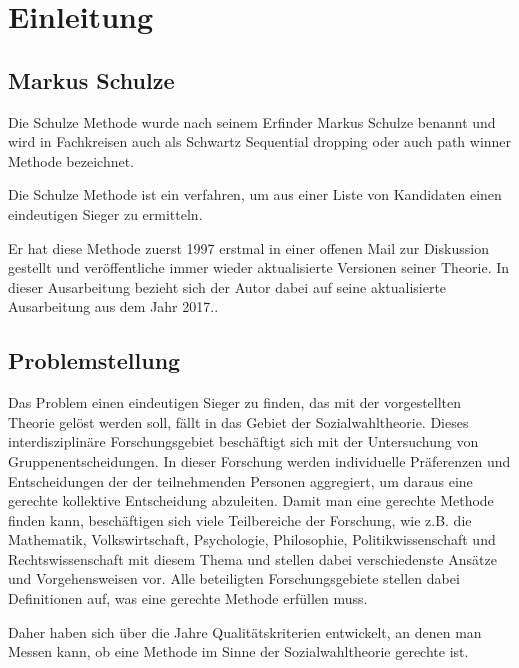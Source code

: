 \section{Einleitung}
\label{sec:Einleitung}


\subsection{Markus Schulze} 
\label{sec:markusSchulze}
Die Schulze Methode wurde nach seinem Erfinder Markus Schulze benannt und wird in Fachkreisen auch als \glqq Schwartz Sequential dropping\grqq{} oder auch \glqq path winner\grqq{} Methode bezeichnet.

Die Schulze Methode ist ein verfahren, um aus einer Liste von Kandidaten einen eindeutigen Sieger zu ermitteln.

Er hat diese Methode zuerst 1997 erstmal in einer offenen Mail zur Diskussion gestellt und veröffentliche immer wieder aktualisierte Versionen seiner Theorie. In dieser Ausarbeitung bezieht sich der Autor dabei auf seine aktualisierte Ausarbeitung aus dem Jahr 2017.\citet[vgl.]{Schulze2017}.

\subsection{Problemstellung} 
\label{sec:problemstellung}
Das Problem einen eindeutigen Sieger zu finden, das mit der vorgestellten Theorie gelöst werden soll, fällt in das Gebiet der Sozialwahltheorie. Dieses interdisziplinäre Forschungsgebiet beschäftigt sich mit der Untersuchung von Gruppenentscheidungen. In dieser Forschung werden individuelle Präferenzen und Entscheidungen der der teilnehmenden Personen aggregiert, um daraus eine \glqq gerechte\grqq{} kollektive Entscheidung abzuleiten. Damit man eine \glqq gerechte\grqq{} Methode finden kann, beschäftigen sich viele Teilbereiche der Forschung, wie z.B. die Mathematik, Volkswirtschaft, Psychologie, Philosophie, Politikwissenschaft und Rechtswissenschaft mit diesem Thema und stellen dabei verschiedenste Ansätze und Vorgehensweisen vor. Alle beteiligten Forschungsgebiete stellen dabei Definitionen auf, was eine \glqq gerechte\grqq{} Methode erfüllen muss. \cite[vgl.]{scheubrein2013computerunterstuetzte}

Daher haben sich über die Jahre Qualitätskriterien entwickelt, an denen man Messen kann, ob eine Methode im Sinne der Sozialwahltheorie \glqq gerechte\grqq{} ist.

